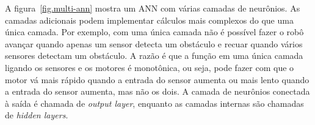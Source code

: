 
A figura~\ref{fig.multi-ann} mostra um ANN com várias camadas de neurônios. As camadas adicionais podem implementar cálculos mais complexos do que uma única camada. Por exemplo, com uma única camada não é possível fazer o robô avançar quando apenas um sensor detecta um obstáculo e recuar quando vários sensores detectam um obstáculo. A razão é que a função em uma única camada ligando os sensores e os motores é monotônica, ou seja, pode fazer com que o motor vá mais rápido quando a entrada do sensor aumenta ou mais lento quando a entrada do sensor aumenta, mas não os dois. A camada de neurônios conectada à saída é chamada de \emph{output layer}, enquanto as camadas internas são chamadas de \emph{hidden layers}.


